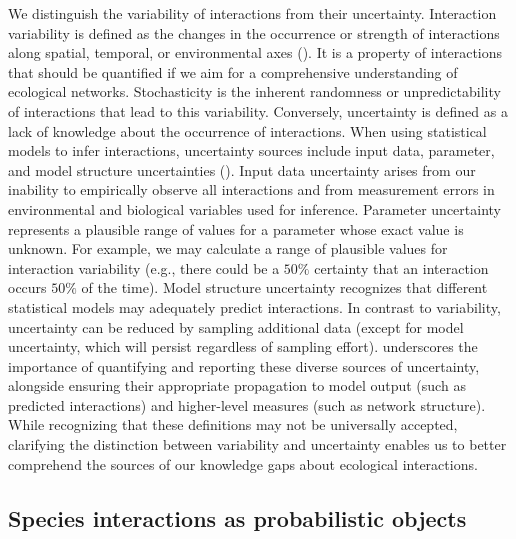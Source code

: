 We distinguish the variability of interactions from their uncertainty.
Interaction variability is defined as the changes in the occurrence or strength
of interactions along spatial, temporal, or environmental axes
(\cite{Poisot2015Species}). It is a property of interactions that should be
quantified if we aim for a comprehensive understanding of ecological networks.
Stochasticity is the inherent randomness or unpredictability of interactions
that lead to this variability. Conversely, uncertainty is defined as a lack of
knowledge about the occurrence of interactions. When using statistical models to
infer interactions, uncertainty sources include input data, parameter, and model
structure uncertainties (\cite{Simmonds2024Recommendations}). Input data uncertainty
arises from our inability to empirically observe all interactions and from
measurement errors in environmental and biological variables used for inference.
Parameter uncertainty represents a plausible range of values for a parameter
whose exact value is unknown. For example, we may calculate a range of plausible
values for interaction variability (e.g., there could be a $50\%$ certainty that
an interaction occurs $50\%$ of the time). Model structure uncertainty
recognizes that different statistical models may adequately predict
interactions. In contrast to variability, uncertainty can be reduced by sampling
additional data (except for model uncertainty, which will persist regardless of
sampling effort). \textcite{Simmonds2024Recommendations} underscores the importance of
quantifying and reporting these diverse sources of uncertainty, alongside
ensuring their appropriate propagation to model output (such as predicted
interactions) and higher-level measures (such as network structure). While
recognizing that these definitions may not be universally accepted, clarifying
the distinction between variability and uncertainty enables us to better
comprehend the sources of our knowledge gaps about ecological interactions.

\subsection{Species interactions as probabilistic objects}

